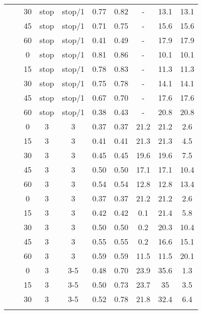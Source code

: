 \begin{longtable}[t]{cccccccccc}
	&  & 30 & stop & stop/1 & 0.77 & 0.82 & - & 13.1 & 13.1\\
	\nopagebreak
	&  & 45 & stop & stop/1 & 0.71 & 0.75 & - & 15.6 & 15.6\\
	\nopagebreak
	& \multirow{-5}{*}{\centering\arraybackslash 0.2} & 60 & stop & stop/1 & 0.41 & 0.49 & - & 17.9 & 17.9\\
	\nopagebreak
	&  & 0 & stop & stop/1 & 0.81 & 0.86 & - & 10.1 & 10.1\\
	\nopagebreak
	&  & 15 & stop & stop/1 & 0.78 & 0.83 & - & 11.3 & 11.3\\
	\nopagebreak
	&  & 30 & stop & stop/1 & 0.75 & 0.78 & - & 14.1 & 14.1\\
	\nopagebreak
	&  & 45 & stop & stop/1 & 0.67 & 0.70 & - & 17.6 & 17.6\\
	\nopagebreak
	\multirow{-10}{*}{\centering\arraybackslash 5} & \multirow{-5}{*}{\centering\arraybackslash 0.33} & 60 & stop & stop/1 & 0.38 & 0.43 & - & 20.8 & 20.8\\
	\cmidrule{1-10}\pagebreak[0]
	&  & 0 & 3 & 3 & 0.37 & 0.37 & 21.2 & 21.2 & 2.6\\
	\nopagebreak
	&  & 15 & 3 & 3 & 0.41 & 0.41 & 21.3 & 21.3 & 4.5\\
	\nopagebreak
	&  & 30 & 3 & 3 & 0.45 & 0.45 & 19.6 & 19.6 & 7.5\\
	\nopagebreak
	&  & 45 & 3 & 3 & 0.50 & 0.50 & 17.1 & 17.1 & 10.4\\
	\nopagebreak
	& \multirow{-5}{*}{\centering\arraybackslash 0.2} & 60 & 3 & 3 & 0.54 & 0.54 & 12.8 & 12.8 & 13.4\\
	\nopagebreak
	&  & 0 & 3 & 3 & 0.37 & 0.37 & 21.2 & 21.2 & 2.6\\
	\nopagebreak
	&  & 15 & 3 & 3 & 0.42 & 0.42 & 0.1 & 21.4 & 5.8\\
	\nopagebreak
	&  & 30 & 3 & 3 & 0.50 & 0.50 & 0.2 & 20.3 & 10.4\\
	\nopagebreak
	&  & 45 & 3 & 3 & 0.55 & 0.55 & 0.2 & 16.6 & 15.1\\
	\nopagebreak
	\multirow{-10}{*}{\centering\arraybackslash 6} & \multirow{-5}{*}{\centering\arraybackslash 0.33} & 60 & 3 & 3 & 0.59 & 0.59 & 11.5 & 11.5 & 20.1\\
	\cmidrule{1-10}\pagebreak[0]
	&  & 0 & 3 & 3-5 & 0.48 & 0.70 & 23.9 & 35.6 & 1.3\\
	\nopagebreak
	&  & 15 & 3 & 3-5 & 0.50 & 0.73 & 23.7 & 35 & 3.5\\
	\nopagebreak
	&  & 30 & 3 & 3-5 & 0.52 & 0.78 & 21.8 & 32.4 & 6.4\\
	\nopagebreak

\end{longtable}
